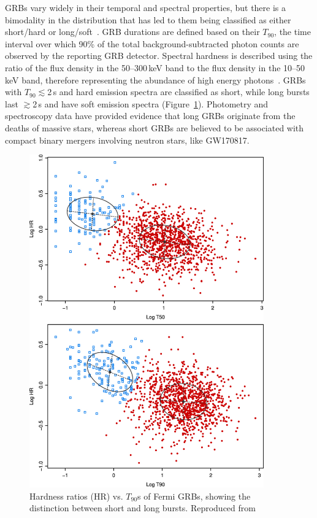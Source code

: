 GRBs vary widely in their temporal and spectral properties, but there is a bimodality in the distribution that has led to them being classified as either short/hard or long/soft~\citep{Kouveliotou_1993}.
GRB durations are defined based on their $T_{90}$, the time interval over which 90\% of the total background-subtracted photon counts are observed by the reporting GRB detector.
Spectral hardness is described using the ratio of the flux density in the 50–300\,keV band to the flux density in the 10–50\,keV band, therefore representing the abundance of high energy photons~\citep{fermi_2020}.
GRBs with $T_{90}\lesssim$2\,s and hard emission spectra are classified as short, while long bursts last $\gtrsim$2\,s and have soft emission spectra (Figure~\ref{fig:grb-classification}).
Photometry and spectroscopy data have provided evidence that long \acp{GRB} originate from the deaths of massive stars, whereas short \acp{GRB} are believed to be associated with compact binary mergers involving neutron stars, like GW170817.

\begin{figure}[htb]
	\includegraphics[trim={0 0 0 6cm}, clip, width=0.9\textwidth]{figures/gw/grb-classification.jpg}
	\caption{Hardness ratios (HR) vs. $T_{90}$s of Fermi GRBs, showing the distinction between short and long bursts. Reproduced from~\protect\citet{fermi_2016}}
	\label{fig:grb-classification}
\end{figure}


